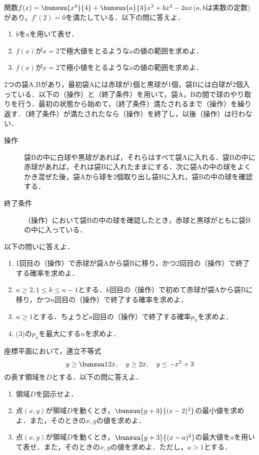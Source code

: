 \begin{problem}
関数$f(x) = \bunsuu{x^4}{4} + \bunsuu{a}{3}x^3 + bx^2 - 2ax$($a,b$は実数の定数)があり，$f'(2) = 0$を満たしている．以下の問に答えよ．
\begin{enumerate}
  \item $b$を$a$を用いて表せ．
  \item $f(x)$が$x=2$で極大値をとるような$a$の値の範囲を求めよ．
  \item $f(x)$が$x=2$で極小値をとるような$a$の値の範囲を求めよ．
\end{enumerate}
\end{problem}

\begin{problem}
2つの袋A,Bがあり，最初袋Aには赤球が1個と黒球が1個，袋Bには白球が2個入っている．以下の（操作）と（終了条件）を用いて，袋A，Bの間で球のやり取りを行う．最初の状態から始めて，（終了条件）満たされるまで（操作）を繰り返す．（終了条件）が満たされたなら（操作）を終了し，以後（操作）は行わない．
\begin{description}
  \item[操作] 袋Bの中に白球や黒球があれば，それらはすべて袋Aに入れる．袋Bの中に赤球があれば，それは袋Bに入れたままにする．次に袋Aの中の球をよくかき混ぜた後，袋Aから球を2個取り出し袋Bに入れ，袋Bの中の球を確認する．
  \item[終了条件] （操作）において袋Bの中の球を確認したとき，赤球と黒球がともに袋Bの中に入っている．
\end{description}

\quad 以下の問いに答えよ．
\begin{enumerate}
  \item 1回目の（操作）で赤球が袋Aから袋Bに移り，かつ2回目の（操作）で終了する確率を求めよ．
  \item $n \geq 2, 1 \leq k \leq n-1$とする．$k$回目の（操作）で初めて赤球が袋Aから袋Bに移り，かつ$n$回目の（操作）で終了する確率を求めよ．
  \item $n \geq 1$とする．ちょうど$n$回目の（操作）で終了する確率$p_n$を求めよ．
  \item (3)の$p_n$を最大にする$n$を求めよ．
\end{enumerate}
\end{problem}

\begin{problem}
座標平面において，連立不等式
\[y \geq \bunsuu12 x ,\quad y \geq 2x,\quad y \leq -x^2 + 3\]
の表す領域を$D$とする．以下の問に答えよ．
\begin{enumerate}
  \item 領域$D$を図示せよ．
  \item 点$(x,y)$が領域$D$を動くとき，$\bunsuu{y+3}{(x-2)^2}$の最小値を求めよ．また，そのときの$x,y$の値を求めよ．
  \item 点$(x,y)$が領域$D$を動くとき，$\bunsuu{y+3}{(x-a)^2}$の最大値を$a$を用いて表せ．また，そのときの$x,y$の値を求めよ．ただし，$a>1$とする．
\end{enumerate}
\end{problem}
